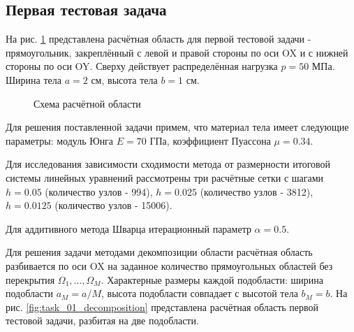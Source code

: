 \documentclass[a4paper]{article}
\begin{document}
\newpage

\subsection{Первая тестовая задача}

На рис. \ref{fig:task_01_scheme} представлена расчётная область для первой тестовой задачи - прямоугольник, закреплённый с левой и правой стороны по оси OX и с нижней стороны по оси OY. Сверху действует распределённая нагрузка $p = 50$ МПа. Ширина тела $a = 2$ см, высота тела $b = 1$ см.

\begin{figure}[h]
\caption{Схема расчётной области}
\label{fig:task_01_scheme}
\end{figure}

Для решения поставленной задачи примем, что материал тела имеет следующие параметры: модуль Юнга $E = 70$ ГПа, коэффициент Пуассона $\mu = 0.34$. 

Для исследования зависимости сходимости метода от размерности итоговой системы линейных уравнений рассмотрены три расчётные сетки с шагами $h = 0.05$ (количество узлов - 994), $h = 0.025$ (количество узлов - 3812), $h = 0.0125$ (количество узлов - 15006).

Для аддитивного метода Шварца итерационный параметр $\alpha = 0.5$.

\newpage

Для решения задачи методами декомпозиции области расчётная область разбивается по оси OX на заданное количество прямоугольных областей без перекрытия $\Omega_1, \ldots, \Omega_M$. Характерные размеры каждой подобласти: ширина подобласти $a_M = a / M$, высота подобласти совпадает с высотой тела $b_M = b$. На рис. \ref{fig:task_01_decomposition} представлена расчётная область первой тестовой задачи, разбитая на две подобласти.
\end{document}
